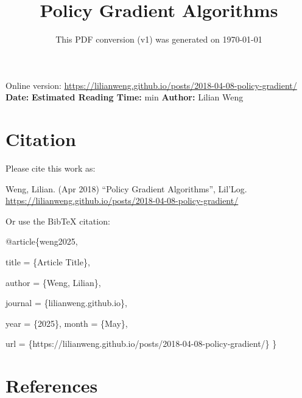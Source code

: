 \documentclass[12pt]{article}
\title{Policy Gradient Algorithms}
\date{This PDF conversion (v1) was generated on \today\footnotemark}
\begin{document}
\maketitle
\begin{center}
    Online version: \url{https://lilianweng.github.io/posts/2018-04-08-policy-gradient/} \\
    \textbf{Date:} \quad
    \textbf{Estimated Reading Time:}  min \quad
    \textbf{Author:} Lilian Weng
\end{center}




\newpage
\tableofcontents
\newpage
\vspace{1em}
\n\n\n\section{Citation}
Please cite this work as:

\begin{tcolorbox}[colback=black!5!white, colframe=black!80!white, boxrule=0.5pt, arc=2mm, left=1mm, right=1mm, top=1mm, bottom=1mm]
  Weng, Lilian. (Apr 2018) ``Policy Gradient Algorithms'', Lil'Log. \url{https://lilianweng.github.io/posts/2018-04-08-policy-gradient/}
  \end{tcolorbox}

Or use the BibTeX citation:

\begin{tcolorbox}[
    colback=black!5!white,
    colframe=black!80!white,
    boxrule=0.5pt,
    arc=2mm,
    left=1mm,
    right=1mm,
    top=1mm,
    bottom=1mm,
    listing only,
    listing options={
      basicstyle=\ttfamily\footnotesize,
      breaklines=true,
      literate={\{}{{\char`\{}}1 {\}}{{\char`\}}}1
    }
  ]
  @article\{weng2025,

    title   = \{Article Title\},

    author  = \{Weng, Lilian\},

    journal = \{lilianweng.github.io\},

    year    = \{2025\},
    month   = \{May\},

    url     = \{https://lilianweng.github.io/posts/2018-04-08-policy-gradient/\}\n
  \}
  \end{tcolorbox}

\newpage
\section{References}

\n
\end{document}
